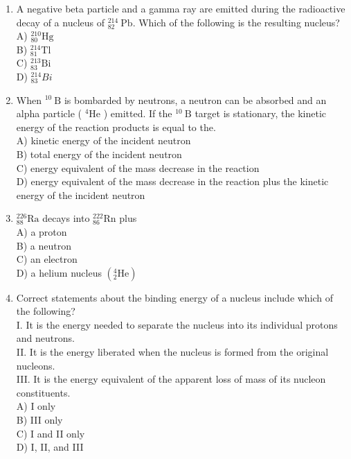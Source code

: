 \begin{enumerate}
\begin{enumerate}
C) I and III only\\
D) II and III only
  \item A negative beta particle and a gamma ray are emitted during the radioactive decay of a nucleus of ${ }_{82}^{214} \mathrm{~Pb}$. Which of the following is the resulting nucleus?\\
A) ${ }_{80}^{210} \mathrm{Hg}$\\
B) ${ }_{81}^{214} \mathrm{Tl}$\\
C) ${ }_{83}^{213} \mathrm{Bi}$\\
D) ${ }_{83}^{214} B i$
  \item When ${ }^{10} \mathrm{~B}$ is bombarded by neutrons, a neutron can be absorbed and an alpha particle ( ${ }^{4} \mathrm{He}$ ) emitted. If the ${ }^{10} \mathrm{~B}$ target is stationary, the kinetic energy of the reaction products is equal to the.\\
A) kinetic energy of the incident neutron\\
B) total energy of the incident neutron\\
C) energy equivalent of the mass decrease in the reaction\\
D) energy equivalent of the mass decrease in the reaction plus the kinetic energy of the incident neutron
  \item ${ }_{88}^{226} \mathrm{Ra}$ decays into ${ }_{86}^{222} \mathrm{Rn}$ plus\\
A) a proton\\
B) a neutron\\
C) an electron\\
D) a helium nucleus $\left({ }_{2}^{4} \mathrm{He}\right)$
  \item Correct statements about the binding energy of a nucleus include which of the following?\\
I. It is the energy needed to separate the nucleus into its individual protons and neutrons.\\
II. It is the energy liberated when the nucleus is formed from the original nucleons.\\
III. It is the energy equivalent of the apparent loss of mass of its nucleon constituents.\\
A) I only\\
B) III only\\
C) I and II only\\
D) I, II, and III
\end{enumerate}


\end{enumerate}
